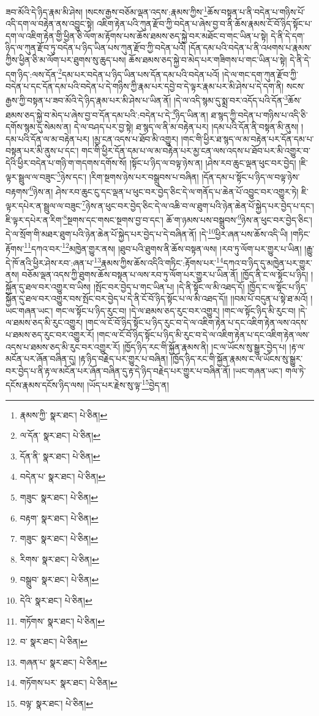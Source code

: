 ཟབ་མོའི་དེ་ཉིད་རྣམ་མི་ཤེས། །སངས་རྒྱས་བཅོམ་ལྡན་འདས་:རྣམས་ཀྱིས་\footnote{རྣམས་ཀྱི་  སྣར་ཐང་།  པེ་ཅིན། }ཆོས་བསྟན་པ་ནི་བདེན་པ་གཉིས་པོ་འདི་དག་ལ་བརྟེན་ནས་འབྱུང་སྟེ། འཇིག་རྟེན་པའི་ཀུན་རྫོབ་ཀྱི་བདེན་པ་ཞེས་བྱ་བ་ནི་ཆོས་རྣམས་ངོ་བོ་ཉིད་སྟོང་པ་དག་ལ་འཇིག་རྟེན་གྱི་ཕྱིན་ཅི་ལོག་མ་རྟོགས་པས་ཆོས་ཐམས་ཅད་སྐྱེ་བར་མཐོང་བ་གང་ཡིན་པ་སྟེ། དེ་ནི་དེ་དག་ཉིད་ལ་ཀུན་རྫོབ་ཏུ་བདེན་པ་ཉིད་ཡིན་པས་ཀུན་རྫོབ་ཀྱི་བདེན་པའོ། །དོན་དམ་པའི་བདེན་པ་ནི་འཕགས་པ་རྣམས་ཀྱིས་ཕྱིན་ཅི་མ་ལོག་པར་ཐུགས་སུ་ཆུད་པས། ཆོས་ཐམས་ཅད་སྐྱེ་བ་མེད་པར་གཟིགས་པ་གང་ཡིན་པ་སྟེ། དེ་ནི་དེ་དག་ཉིད་:ལས་དོན་\footnote{ལ་དོན་  སྣར་ཐང་།  པེ་ཅིན། }དམ་པར་བདེན་པ་ཉིད་ཡིན་པས་དོན་དམ་པའི་བདེན་པའོ། །དེ་ལ་གང་དག་ཀུན་རྫོབ་ཀྱི་བདེན་པ་དང་དོན་དམ་པའི་བདེན་པ་དེ་གཉིས་ཀྱི་རྣམ་པར་དབྱེ་བ་དེ་ལྟར་རྣམ་པར་མི་ཤེས་པ་དེ་དག་ནི། སངས་རྒྱས་ཀྱི་བསྟན་པ་ཟབ་མོའི་དེ་ཉིད་རྣམ་པར་མི་ཤེས་པ་ཡིན་ནོ། །དེ་ལ་འདི་སྙམ་དུ་སྨྲ་བར་འདོད་པའི་དོན་\footnote{དོན་ནི་  སྣར་ཐང་།  པེ་ཅིན། }ཆོས་ཐམས་ཅད་སྐྱེ་བ་མེད་པ་ཞེས་བྱ་བ་དོན་དམ་པའི་:བདེན་པ་དེ་\footnote{བདེན་པ་  སྣར་ཐང་།  པེ་ཅིན། }ཉིད་ཡིན་ན། ཐ་སྙད་ཀྱི་བདེན་པ་གཉིས་པ་འདི་ཅི་དགོས་སྙམ་དུ་སེམས་ན། དེ་ལ་བཤད་པར་བྱ་སྟེ། ཐ་སྙད་ལ་ནི་མ་བརྟེན་པར། །དམ་པའི་དོན་ནི་བསྟན་མི་ནུས། །དམ་པའི་དོན་ལ་མ་བརྟེན་པར། །མྱ་ངན་འདས་པ་ཐོབ་མི་འགྱུར། །གང་གི་ཕྱིར་ཐ་སྙད་ལ་མ་བརྟེན་པར་དོན་དམ་པ་བསྟན་པར་མི་ནུས་པ་དང་། གང་གི་ཕྱིར་དོན་དམ་པ་ལ་མ་བརྟེན་པར་མྱ་ངན་ལས་འདས་པ་ཐོབ་པར་མི་འགྱུར་བ་དེའི་ཕྱིར་བདེན་པ་གཉི་ག་གདགས་དགོས་སོ། །སྟོང་པ་ཉིད་ལ་བལྟ་ཉེས་ན། །ཤེས་རབ་ཆུང་ལྡན་ཕུང་བར་བྱེད། །ཇི་ལྟར་སྦྲུལ་ལ་བཟུང་\footnote{གཟུང་  སྣར་ཐང་།  པེ་ཅིན། }ཉེས་དང་། །རིག་སྔགས་ཉེས་པར་བསྒྲུབས་པ་བཞིན། །དོན་དམ་པ་སྟོང་པ་ཉིད་ལ་བལྟ་ཉེས་བརྟགས་\footnote{བརྟག་  སྣར་ཐང་།  པེ་ཅིན། }ཉེས་ན། ཤེས་རབ་ཆུང་ངུ་དང་ལྡན་པ་ཕུང་བར་བྱེད་ཅིང་དེ་ལ་གནོད་པ་ཆེན་པོ་འབྱུང་བར་འགྱུར་ཏེ། ཇི་ལྟར་དཔེར་ན་སྦྲུལ་ལ་བཟུང་\footnote{གཟུང་  སྣར་ཐང་།  པེ་ཅིན། }ཉེས་ན་ཕུང་བར་བྱེད་ཅིང་དེ་ལ་འཆི་བ་ལ་ཐུག་པའི་ཉེན་ཆེན་པོ་སྐྱེད་པར་བྱེད་པ་དང་། ཇི་ལྟར་དཔེར་ན་རིག་\footnote{རིགས་  སྣར་ཐང་།  པེ་ཅིན། }སྔགས་དང་གསང་སྔགས་བྱ་བ་དང་། ཆོ་ག་ཉམས་པས་བསྒྲུབས་\footnote{བསྒྲུབ་  སྣར་ཐང་།  པེ་ཅིན། }ཉེས་ན་ཕུང་བར་བྱེད་ཅིང་། དེ་ལ་སྲོག་གི་མཐར་ཐུག་པའི་ཉེན་ཆེན་པོ་སྐྱེད་པར་བྱེད་པ་དེ་བཞིན་ནོ། །དེ་\footnote{དེའི་  སྣར་ཐང་།  པེ་ཅིན། }ཕྱིར་ཞན་པས་ཆོས་འདི་ཡི། །གཏིང་རྟོགས་\footnote{གཏོགས་  སྣར་ཐང་།  པེ་ཅིན། }དཀའ་བར་\footnote{བ་  སྣར་ཐང་།  པེ་ཅིན། }མཁྱེན་གྱུར་ནས། །ཐུབ་པའི་ཐུགས་ནི་ཆོས་བསྟན་ལས། །རབ་ཏུ་ལོག་པར་གྱུར་པ་ཡིན། །རྒྱུ་དེ་ཁོ་ནའི་ཕྱིར་ཤེས་རབ་:ཞན་པ་\footnote{གཞན་པ་  སྣར་ཐང་།  པེ་ཅིན། }རྣམས་ཀྱིས་ཆོས་འདིའི་གཏིང་:རྟོགས་པར་\footnote{གཏོགས་པར་  སྣར་ཐང་།  པེ་ཅིན། }དཀའ་བ་ཉིད་དུ་མཁྱེན་པར་གྱུར་ནས། བཅོམ་ལྡན་འདས་ཀྱི་ཐུགས་ཆོས་བསྟན་པ་ལས་རབ་ཏུ་ལོག་པར་གྱུར་པ་ཡིན་ནོ། །ཁྱོད་ནི་ང་ལ་སྟོང་པ་ཉིད། །སྐྱོན་དུ་ཐལ་བར་འགྱུར་བ་ཡིས། །སྤོང་བར་བྱེད་པ་གང་ཡིན་པ། །དེ་ནི་སྟོང་ལ་མི་འཐད་དོ། །ཁྱོད་ང་ལ་སྟོང་པ་ཉིད་སྐྱོན་དུ་ཐལ་བར་འགྱུར་བས་སྤོང་བར་བྱེད་པ་དེ་ནི་ངོ་བོ་ཉིད་སྟོང་པ་ལ་མི་འཐད་དོ།། །།བམ་པོ་བདུན་པ་སྟེ་ཐ་མའོ། །ཡང་གཞན་ཡང་། གང་ལ་སྟོང་པ་ཉིད་རུང་བ། །དེ་ལ་ཐམས་ཅད་རུང་བར་འགྱུར། །གང་ལ་སྟོང་ཉིད་མི་རུང་བ། །དེ་ལ་ཐམས་ཅད་མི་རུང་འགྱུར། །གང་ལ་ངོ་བོ་ཉིད་སྟོང་པ་ཉིད་རུང་བ་དེ་ལ་འཇིག་རྟེན་པ་དང་འཇིག་རྟེན་ལས་འདས་པ་ཐམས་ཅད་རུང་བར་འགྱུར་རོ། །གང་ལ་ངོ་བོ་ཉིད་སྟོང་པ་ཉིད་མི་རུང་བ་དེ་ལ་འཇིག་རྟེན་པ་དང་འཇིག་རྟེན་ལས་འདས་པ་ཐམས་ཅད་མི་རུང་བར་འགྱུར་རོ། །ཁྱོད་ཉིད་རང་གི་སྐྱོན་རྣམས་ནི། །ང་ལ་ཡོངས་སུ་སྒྱུར་བྱེད་པ། །རྟ་ལ་མངོན་པར་ཞོན་བཞིན་དུ། །རྟ་ཉིད་བརྗེད་པར་གྱུར་པ་བཞིན། །ཁྱོད་ཉིད་རང་གི་སྐྱོན་རྣམས་ང་ལ་ཡོངས་སུ་སྒྱུར་བར་བྱེད་པ་ནི་རྟ་ལ་མངོན་པར་ཞོན་བཞིན་དུ་རྟ་དེ་ཉིད་བརྗེད་པར་གྱུར་པ་བཞིན་ནོ། །ཡང་གཞན་ཡང་། གལ་ཏེ་དངོས་རྣམས་དངོས་ཉིད་ལས། །ཡོད་པར་རྗེས་སུ་ལྟ་\footnote{བལྟ་  སྣར་ཐང་།  པེ་ཅིན། }བྱེད་ན། 